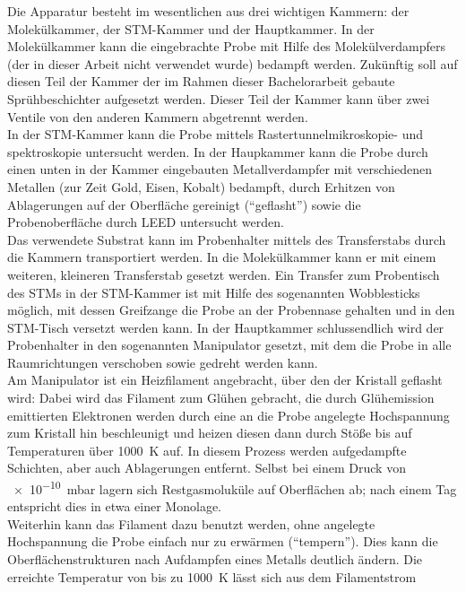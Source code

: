 Die Apparatur besteht im wesentlichen aus drei wichtigen Kammern: 
der 
Molekülkammer, der STM-Kammer und der Hauptkammer. In der Molekülkammer kann die eingebrachte
Probe mit Hilfe des Molekülverdampfers (der in dieser Arbeit nicht verwendet wurde) bedampft werden.
Zukünftig soll auf diesen Teil der Kammer der im Rahmen dieser Bachelorarbeit gebaute
Sprühbeschichter aufgesetzt werden. Dieser Teil der Kammer kann über zwei Ventile von den anderen
Kammern abgetrennt werden.\\
In der STM-Kammer kann die Probe
mittels Rastertunnelmikroskopie- und spektroskopie untersucht werden. In der Haupkammer kann die
Probe durch einen unten in der Kammer eingebauten Metallverdampfer mit
verschiedenen Metallen (zur Zeit Gold, Eisen, Kobalt) bedampft, durch Erhitzen von Ablagerungen auf
der Oberfläche gereinigt ("`geflasht"') sowie die Probenoberfläche durch LEED untersucht werden. 
\\
Das verwendete Substrat kann im Probenhalter mittels des
Transferstabs durch die Kammern transportiert werden. In die Molekülkammer kann er mit einem
weiteren, kleineren Transferstab gesetzt werden. Ein Transfer zum Probentisch des STMs in der
STM-Kammer ist mit Hilfe des sogenannten Wobblesticks möglich, mit dessen Greifzange die Probe an der Probennase gehalten und in
den STM-Tisch versetzt werden kann. In der Hauptkammer schlussendlich wird der Probenhalter in den
sogenannten Manipulator gesetzt, mit dem die Probe in alle Raumrichtungen verschoben sowie gedreht
werden kann. \\
Am Manipulator ist ein Heizfilament angebracht, über den der Kristall geflasht wird:
Dabei wird das Filament zum Glühen gebracht, die durch Glühemission emittierten Elektronen werden
durch eine an die Probe angelegte Hochspannung zum Kristall hin beschleunigt und heizen diesen dann
durch Stöße bis auf Temperaturen über \SI{1000}{K} auf. In diesem Prozess werden aufgedampfte
Schichten, aber auch Ablagerungen entfernt. Selbst bei einem Druck von \SI{e-10}{mbar} lagern sich
Restgasmoluküle auf Oberflächen ab; nach einem Tag entspricht dies in etwa einer Monolage.\\
Weiterhin kann das Filament dazu benutzt werden, ohne angelegte Hochspannung die Probe einfach nur
zu erwärmen ("`tempern"'). Dies kann die Oberflächenstrukturen nach Aufdampfen eines Metalls
deutlich ändern. Die erreichte Temperatur von bis zu \SI{1000}{K} lässt sich aus dem Filamentstrom
